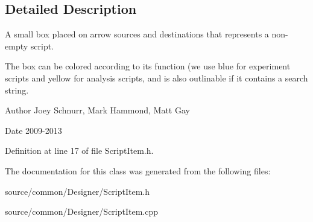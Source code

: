 \subsection{Detailed Description}
A small box placed on arrow sources and destinations that represents a non-\/empty script. 

The box can be colored according to its function (we use blue for experiment scripts and yellow for analysis scripts, and is also outlinable if it contains a search string. \begin{DoxyAuthor}{Author}
Joey Schnurr, Mark Hammond, Matt Gay 
\end{DoxyAuthor}
\begin{DoxyDate}{Date}
2009-\/2013 
\end{DoxyDate}


Definition at line 17 of file Script\-Item.\-h.



The documentation for this class was generated from the following files\-:\begin{DoxyCompactItemize}
\item 
source/common/\-Designer/Script\-Item.\-h\item 
source/common/\-Designer/Script\-Item.\-cpp\end{DoxyCompactItemize}
